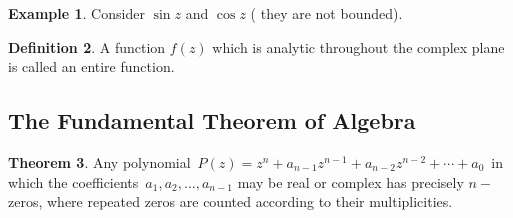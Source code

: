 \documentclass[11pt,a4paper]{article}
\theoremstyle{definition}
\newtheorem{thm}{Theorem}[section]
\newtheorem{definition}[thm]{Definition}
\newtheorem{example}[thm]{Example}
\begin{document}
\begin{example}
Consider $\sin z$ and $\cos z$ ( they are not bounded).
\end{example}

\begin{definition}
A function $f(z)$ which is analytic throughout the complex plane is called an entire function.
\end{definition}

{\color[wave]{485}\subsection{The Fundamental Theorem of Algebra}}
\begin{thm}
Any polynomial $\, \displaystyle{P(z) = z^n + a_{n-1}z^{n-1} + a_{n-2}z^{n - 2} + \cdots + a_0}\,$ in which the coefficients $\,a_1, a_2, \ldots, a_{n-1}$ may be real or complex has precisely $n-$zeros, where repeated zeros are counted according to their multiplicities.\\
\end{thm}
\end{document}
